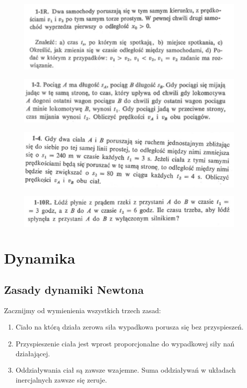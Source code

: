 \documentclass[11pt]{article}
\theoremstyle{definition}
\numberwithin{zad}{section}
\begin{document}
\begin{figure}[H]
\centering
\includegraphics[width=0.8\linewidth]{./svt/kruczek1.png}
\end{figure}

\begin{figure}[H]
\centering
\includegraphics[width=0.8\linewidth]{./svt/kruczek2.png}
\end{figure}

\begin{figure}[H]
\centering
\includegraphics[width=0.8\linewidth]{./svt/kruczek3.png}
\end{figure}

\begin{figure}[H]
\centering
\includegraphics[width=0.8\linewidth]{./svt/kruczek4.png}
\end{figure}

\section{Dynamika}
\subsection{Zasady dynamiki Newtona}

Zacznijmy od wymienienia wszystkich trzech zasad:

\begin{enumerate}
\item Ciało na którą działa zerowa siła wypadkowa porusza się bez przyspieszeń.
\item Przyspieszenie ciała jest wprost proporcjonalne do wypadkowej siły nań działającej.
\item Oddziaływania ciał są zawsze wzajemne. Suma oddziaływań w układach inercjalnych zawsze się zeruje.
\end{enumerate}
\end{document}
